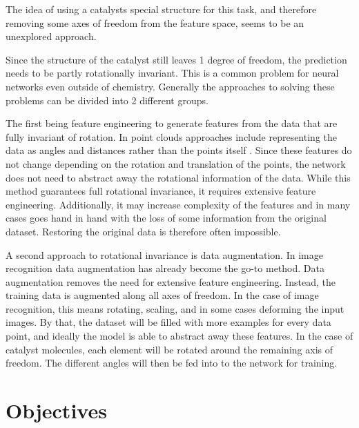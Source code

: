 The idea of using a catalysts special structure for this task, and therefore removing some axes of freedom from the feature space, seems to be an unexplored approach.

Since the structure of the catalyst still leaves 1 degree of freedom, the prediction needs to be partly rotationally invariant.
This is a common problem for neural networks even outside of chemistry.
Generally the approaches to solving these problems can be divided into 2 different groups.

The first being feature engineering to generate features from the data that are fully invariant of rotation.
In point clouds approaches include representing the data as angles and distances rather than the points itself \cite{weiler20183d, 8886052}.
Since these features do not change depending on the rotation and translation of the points, the network does not need to 
abstract away the rotational information of the data.
While this method guarantees full rotational invariance, it requires extensive feature engineering.
Additionally, it may increase complexity of the features and in many cases 
goes hand in hand with the loss of some information from the original dataset. 
Restoring the original data is therefore often impossible.

A second approach to rotational invariance is data augmentation.
In image recognition data augmentation has already become the go-to method.
Data augmentation removes the need for extensive feature engineering.
Instead, the training data is augmented along all axes of freedom.
In the case of image recognition, this means rotating, scaling, and in some cases deforming the input images.
By that, the dataset will be filled with more examples for every data point, and ideally the model is able to 
abstract away these features. %
In the case of catalyst molecules, each element will be rotated around the remaining axis of freedom.
The different angles will then be fed into to the network for training.

\section{Objectives}

